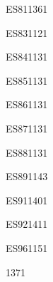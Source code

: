 \documentclass[a4paper,11pt]{report}
\begin{document}
\begin{exof}{ES81}{136}{1}
\end{exof}
	\begin{exol}{ES83}{112}{1}
	\end{exol}
		\begin{exol}{ES84}{113}{1}
		\end{exol}
			\begin{exol}{ES85}{113}{1}
			\end{exol}
				\begin{exol}{ES86}{113}{1}
				\end{exol}
					\begin{exol}{ES87}{113}{1}
					\end{exol}
						\begin{exol}{ES88}{113}{1}
						\end{exol}
							\begin{exol}{ES89}{114}{3}
							\end{exol}
								\begin{exof}{ES91}{140}{1}
								\end{exof}
									\begin{exof}{ES92}{141}{1}
									\end{exof}
										\begin{exol}{ES96}{115}{1}
										\end{exol}

										\begin{FLP}{137}{1}
\end{FLP}
\end{document}
